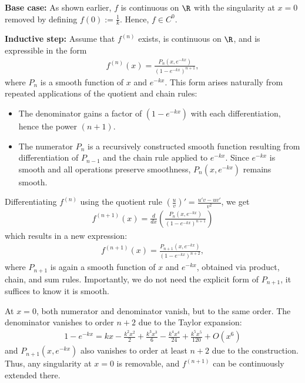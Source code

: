 \begin{Itemize}
    \Item{} \textbf{Base case:} As shown earlier, $f$ is continuous on $\R$ with the singularity at $x = 0$ removed by defining $f(0) := \frac{1}{k}$. Hence, $f \in C^0$.

    \Item{} \textbf{Inductive step:} Assume that $f^{(n)}$ exists, is continuous on $\R$, and is expressible in the form
    \begin{align}
        f^{(n)}(x) = \frac{P_n(x, e^{-kx})}{(1 - e^{-kx})^{n+1}},
    \end{align}
    where $P_n$ is a smooth function of $x$ and $e^{-kx}$. This form arises naturally from repeated applications of the quotient and chain rules:
    
    \begin{itemize}
        \item The denominator gains a factor of $(1 - e^{-kx})$ with each differentiation, hence the power $(n+1)$.
        \item The numerator $P_n$ is a recursively constructed smooth function resulting from differentiation of $P_{n-1}$ and the chain rule applied to $e^{-kx}$. Since $e^{-kx}$ is smooth and all operations preserve smoothness, $P_n(x, e^{-kx})$ remains smooth.
    \end{itemize}
    
    Differentiating $f^{(n)}$ using the quotient rule $\left(\frac{u}{v}\right)' = \frac{u' v - u v'}{v^2}$, we get
    \begin{align}
        f^{(n+1)}(x) = \frac{d}{dx} \left( \frac{P_n(x, e^{-kx})}{(1 - e^{-kx})^{n+1}} \right)
    \end{align}
    which results in a new expression:
    \begin{align}
        f^{(n+1)}(x) = \frac{P_{n+1}(x, e^{-kx})}{(1 - e^{-kx})^{n+2}},
    \end{align}
    where $P_{n+1}$ is again a smooth function of $x$ and $e^{-kx}$, obtained via product, chain, and sum rules. Importantly, we do not need the explicit form of $P_{n+1}$, it suffices to know it is smooth.

    At $x = 0$, both numerator and denominator vanish, but to the same order. The denominator vanishes to order $n+2$ due to the Taylor expansion:
    \begin{align}
        1 - e^{-kx} = kx - \frac{k^2 x^2}{2} + \frac{k^3 x^3}{6} - \frac{k^4 x^4}{24} + \frac{k^5 x^5}{120} + O(x^6)
    \end{align}
    and $P_{n+1}(x, e^{-kx})$ also vanishes to order at least $n+2$ due to the construction. Thus, any singularity at $x = 0$ is removable, and $f^{(n+1)}$ can be continuously extended there.
\end{Itemize}

